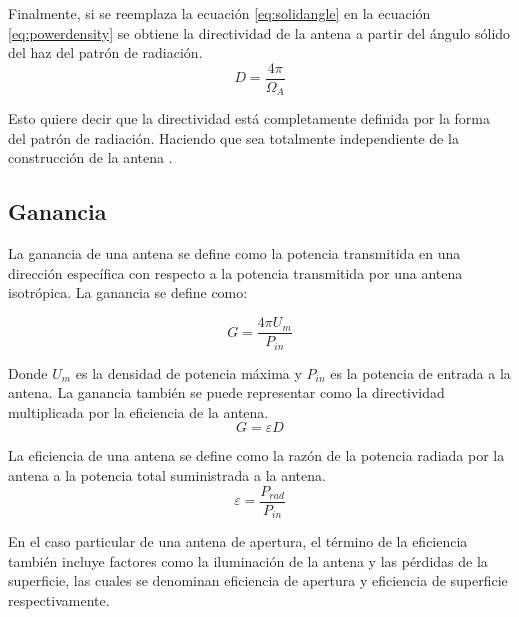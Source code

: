 Finalmente, si se reemplaza la ecuación \ref{eq:solidangle} en la ecuación \ref{eq:powerdensity} se obtiene la directividad de la antena a partir del ángulo sólido del haz del patrón de radiación.\\

\begin{equation}
    D = \frac{4\pi}{\Omega_{A}}
\end{equation}

Esto quiere decir que la directividad está completamente definida por la forma del patrón de radiación. Haciendo que sea totalmente independiente de la construcción de la antena \cite{stutzman2012antenna}.\\


\subsection{Ganancia}

La ganancia de una antena se define como la potencia transmitida en una dirección específica con respecto a la potencia transmitida por una antena isotrópica. La ganancia se define como:

\begin{equation}
    G = \frac{4\pi U_{m}}{P_{in}}
\end{equation}

Donde $U_{m}$ es la densidad de potencia máxima y $P_{in}$ es la potencia de entrada a la antena. La ganancia también se puede representar como la directividad multiplicada por la eficiencia de la antena.\\

\begin{equation}
    G = \varepsilon D 
\end{equation}

La eficiencia de una antena se define como la razón de la potencia radiada por la antena a la potencia total suministrada a la antena.\\

\begin{equation}
    \varepsilon = \frac{P_{rad}}{P_{in}}
\end{equation}

En el caso particular de una antena de apertura, el término de la eficiencia también incluye factores como la iluminación de la antena y las pérdidas de la superficie, las cuales se denominan eficiencia de apertura y eficiencia de superficie respectivamente.\\

